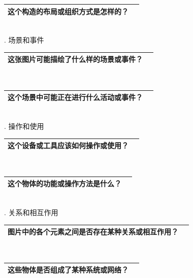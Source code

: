 \documentclass[12pt]{book}
\begin{document}
\begin{tabular}{|p{15cm}|p{3cm}|}
	\hline
这个构造的布局或组织方式是怎样的？\\
	\hline
\end{tabular}\\



. 场景和事件

\begin{tabular}{|p{15cm}|p{3cm}|}
	\hline
这张图片可能描绘了什么样的场景或事件？\\
	\hline
\end{tabular}\\



\begin{tabular}{|p{15cm}|p{3cm}|}
	\hline
这个场景中可能正在进行什么活动或事件？\\
	\hline
\end{tabular}\\



. 操作和使用

\begin{tabular}{|p{15cm}|p{3cm}|}
	\hline
这个设备或工具应该如何操作或使用？\\
	\hline
\end{tabular}\\


\begin{tabular}{|p{15cm}|p{3cm}|}
	\hline
这个物体的功能或操作方法是什么？\\
	\hline
\end{tabular}\\



. 关系和相互作用

\begin{tabular}{|p{15cm}|p{3cm}|}
	\hline
图片中的各个元素之间是否存在某种关系或相互作用？\\
	\hline
\end{tabular}\\



\begin{tabular}{|p{15cm}|p{3cm}|}
	\hline
这些物体是否组成了某种系统或网络？\\
	\hline
\end{tabular}\\
\end{document}
